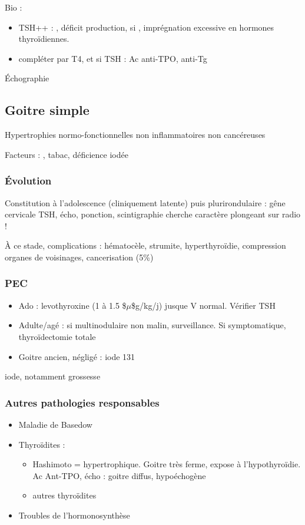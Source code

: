 \documentclass[11pt]{article}
\begin{document}
Bio : 
\begin{itemize}
\item TSH++ : \inc, déficit production, si \dec, imprégnation excessive en hormones thyroïdiennes.
\item compléter par T4, et si TSH \inc : Ac anti-TPO, anti-Tg
\end{itemize}

Échographie

\subsection{Goitre simple}
\label{sec:org43a1068}
Hypertrophies normo-fonctionnelles non inflammatoires non cancéreuses

Facteurs : \female, tabac, déficience iodée

\subsubsection{Évolution}
\label{sec:org912f7be}
Constitution à l'adolescence (cliniquement latente) puis plurirondulaire : gêne
cervicale \thus TSH, écho, ponction, scintigraphie
\danger cherche caractère plongeant sur radio !

À ce stade, complications : hématocèle, strumite, hyperthyroïdie, compression
organes de voisinages, cancerisation (5\%)

\subsubsection{PEC}
\label{sec:orgd2f73d2}
\begin{itemize}
\item Ado : levothyroxine (1 à 1.5 \$\(\mu\)\$g/kg/j) jusque V normal. Vérifier TSH
\item Adulte/agé : si multinodulaire non malin, surveillance. Si symptomatique,
thyroïdectomie totale
\item Goitre ancien, négligé : iode 131
\end{itemize}
\inc iode, notamment grossesse

\subsubsection{Autres pathologies responsables}
\label{sec:org8ab14a4}
\begin{itemize}
\item Maladie de Basedow
\item Thyroïdites : 
\begin{itemize}
\item Hashimoto = hypertrophique. Goitre très ferme, expose à l'hypothyroïdie. Ac Ant-TPO\inc\inc{}, écho : goitre diffus, hypoéchogène
\item autres thyroïdites
\end{itemize}
\item Troubles de l'hormonosynthèse
\end{itemize}
\end{document}
